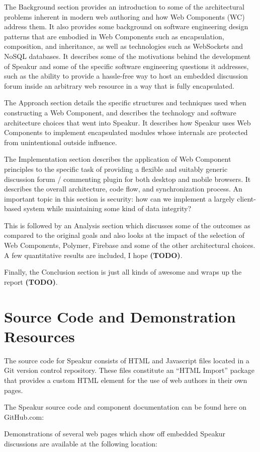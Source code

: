 The Background section provides an introduction to some of the architectural problems inherent in modern web authoring and how Web Components (WC) address them. 
It also provides some background on software engineering design patterns that are embodied in Web Components such as encapsulation, composition, and inheritance, as well as technologies such as WebSockets and NoSQL databases.
It describes some of the motivations behind the development of Speakur and some of the specific software engineering questions it addresses, such as the ability to provide a hassle-free way to host an embedded discussion forum inside an arbitrary web resource in a way that is fully encapsulated.

The Approach section details the specific structures and techniques used when constructing a Web Component, and describes the technology and software architecture choices that went into Speakur. 
It describes how Speakur uses Web Components to implement encapsulated modules whose internals are protected from unintentional outside influence.

The Implementation section describes the application of Web Component principles to the specific task of providing a flexible and suitably generic discussion forum / commenting plugin for both desktop and mobile browsers. 
It describes the overall architecture, code flow, and synchronization process.
An important topic in this section is security: how can we implement a largely client-based system while maintaining some kind of data integrity?

This is followed by an Analysis section which discusses some of the outcomes as compared to the original goals and also looks at the impact of the selection of Web Components, Polymer, Firebase and some of the other architectural choices. 
A few quantitative results are included, I hope \textbf{(TODO)}.

Finally, the Conclusion section is just all kinds of awesome and wraps up the report \textbf{(TODO)}. 

\section{Source Code and Demonstration Resources}
%

The source code for Speakur consists of HTML and Javascript files located in a Git version control repository. 
These files constitute an ``HTML Import'' package that provides a
custom HTML element for the use of web authors in their own pages.

The Speakur source code and component documentation can be found here on GitHub.com:


Demonstrations of several web pages which show off embedded Speakur discussions are available at the following location:


